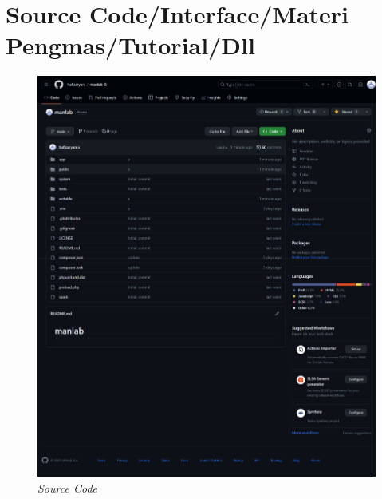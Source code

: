 %


%


\renewcommand{\thepage}{D - \arabic{page}}
\chapter{Source Code/Interface/Materi Pengmas/Tutorial/Dll}

\begin{figure}
    \centering
    \includegraphics[width=1\linewidth]{konten//gambar/Source Code.png}
    \caption{\textit{Source Code}}
    \label{fig:enter-label}
\end{figure}
